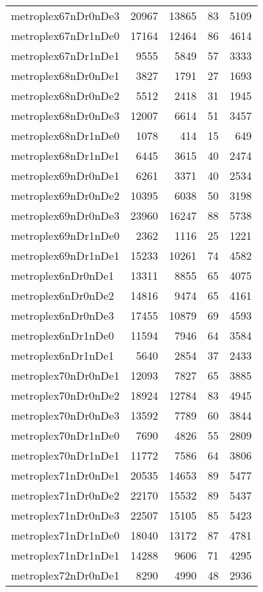 \begin{longtable}{lrrrr}
metroplex67nDr0nDe3 & 20967 & 13865 & 83 & 5109 \\
metroplex67nDr1nDe0 & 17164 & 12464 & 86 & 4614 \\
metroplex67nDr1nDe1 & 9555 & 5849 & 57 & 3333 \\
metroplex68nDr0nDe1 & 3827 & 1791 & 27 & 1693 \\
metroplex68nDr0nDe2 & 5512 & 2418 & 31 & 1945 \\
metroplex68nDr0nDe3 & 12007 & 6614 & 51 & 3457 \\
metroplex68nDr1nDe0 & 1078 & 414 & 15 & 649 \\
metroplex68nDr1nDe1 & 6445 & 3615 & 40 & 2474 \\
metroplex69nDr0nDe1 & 6261 & 3371 & 40 & 2534 \\
metroplex69nDr0nDe2 & 10395 & 6038 & 50 & 3198 \\
metroplex69nDr0nDe3 & 23960 & 16247 & 88 & 5738 \\
metroplex69nDr1nDe0 & 2362 & 1116 & 25 & 1221 \\
metroplex69nDr1nDe1 & 15233 & 10261 & 74 & 4582 \\
metroplex6nDr0nDe1 & 13311 & 8855 & 65 & 4075 \\
metroplex6nDr0nDe2 & 14816 & 9474 & 65 & 4161 \\
metroplex6nDr0nDe3 & 17455 & 10879 & 69 & 4593 \\
metroplex6nDr1nDe0 & 11594 & 7946 & 64 & 3584 \\
metroplex6nDr1nDe1 & 5640 & 2854 & 37 & 2433 \\
metroplex70nDr0nDe1 & 12093 & 7827 & 65 & 3885 \\
metroplex70nDr0nDe2 & 18924 & 12784 & 83 & 4945 \\
metroplex70nDr0nDe3 & 13592 & 7789 & 60 & 3844 \\
metroplex70nDr1nDe0 & 7690 & 4826 & 55 & 2809 \\
metroplex70nDr1nDe1 & 11772 & 7586 & 64 & 3806 \\
metroplex71nDr0nDe1 & 20535 & 14653 & 89 & 5477 \\
metroplex71nDr0nDe2 & 22170 & 15532 & 89 & 5437 \\
metroplex71nDr0nDe3 & 22507 & 15105 & 85 & 5423 \\
metroplex71nDr1nDe0 & 18040 & 13172 & 87 & 4781 \\
metroplex71nDr1nDe1 & 14288 & 9606 & 71 & 4295 \\
metroplex72nDr0nDe1 & 8290 & 4990 & 48 & 2936 \\

\end{longtable}
